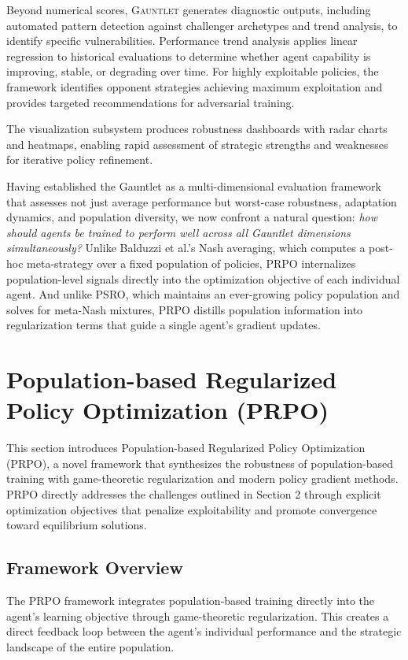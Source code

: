 \documentclass[sigconf,anonymous]{aamas}
\begin{document}
Beyond numerical scores, \textsc{Gauntlet} generates diagnostic outputs, including automated pattern detection against challenger archetypes and trend analysis, to identify specific vulnerabilities. Performance trend analysis applies linear regression to historical evaluations to determine whether agent capability is improving, stable, or degrading over time. For highly exploitable policies, the framework identifies opponent strategies achieving maximum exploitation and provides targeted recommendations for adversarial training.

The visualization subsystem produces robustness dashboards with radar charts and heatmaps, enabling rapid assessment of strategic strengths and weaknesses for iterative policy refinement.

Having established the Gauntlet as a multi-dimensional evaluation framework that assesses not just average performance but worst-case robustness, adaptation dynamics, and population diversity, we now confront a natural question: \emph{how should agents be trained to perform well across all Gauntlet dimensions simultaneously?} Unlike Balduzzi et al.'s Nash averaging, which computes a post-hoc meta-strategy over a fixed population of policies, PRPO internalizes population-level signals directly into the optimization objective of each individual agent. And unlike PSRO, which maintains an ever-growing policy population and solves for meta-Nash mixtures, PRPO distills population information into regularization terms that guide a single agent's gradient updates.





\section{Population-based Regularized Policy Optimization (PRPO)}

This section introduces Population-based Regularized Policy Optimization (PRPO), a novel framework that synthesizes the robustness of population-based training with game-theoretic regularization and modern policy gradient methods. PRPO directly addresses the challenges outlined in Section 2 through explicit optimization objectives that penalize exploitability and promote convergence toward equilibrium solutions.

\subsection{Framework Overview}
The PRPO framework integrates population-based training directly into the agent's learning objective through game-theoretic regularization. This creates a direct feedback loop between the agent's individual performance and the strategic landscape of the entire population.
\end{document}
